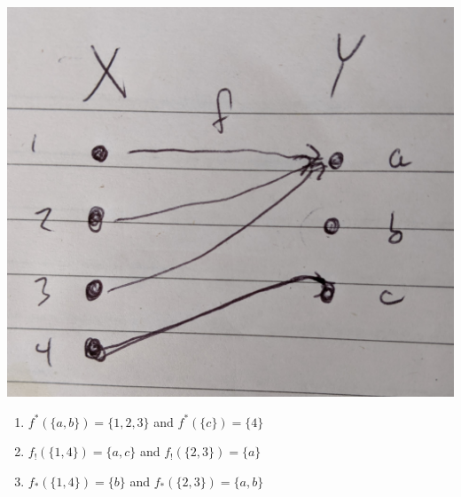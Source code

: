 \solution
\includegraphics[width=0.5\linewidth]{images/1-118.jpg}
\begin{enumerate}
	\item $f^*(\{a,b\}) = \{1,2,3\}$ and $f^*(\{c\})=\{4\}$
	\item $f_!(\{1,4\}) = \{a,c\}$ and $f_!(\{2,3\})=\{a\}$
	\item $f_*(\{1,4\}) = \{b\}$ and $f_*(\{2,3\})=\{a, b\}$
\end{enumerate}


